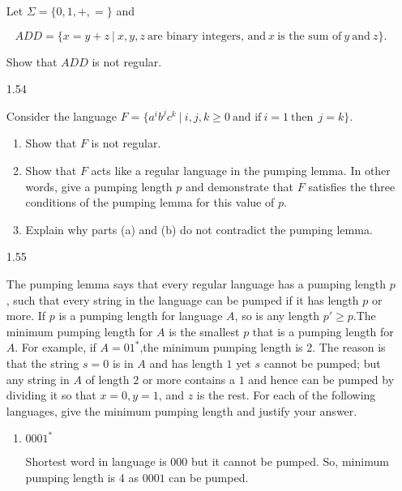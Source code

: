 \begin{enumerate}
            Let $\Sigma = \{0,1,+,=\}$ and 
            
            $$ADD = \{x=y+z~|~x,y,z~\text{are binary integers, and}~ x~ \text{is the sum of}~ y ~\text{and}~ z\}.$$
            
            Show that $ADD$ is not regular.
            
      \item [1.54]
            
            Consider the language $F = \{a^i b^j c^k ~|~ i,j,k \geq 0~ \text{and if}~ i=1~ \text{then}~~ j = k\}$. 
            \begin{enumerate}
                  \item Show that $F$ is not regular.
                  \item Show that $F$ acts like a regular language in the pumping lemma. In other words, give a pumping length $p$ and demonstrate that $F$ satisfies the three conditions of the pumping lemma for this value of $p$.
                  \item Explain why parts (a) and (b) do not contradict the pumping lemma.
                        
            \end{enumerate}
            
      \item [1.55]
            
            The pumping lemma says that every regular language has a pumping length $p$, such that every string in the language can be pumped if it has length $p$ or more. If $p$ is a pumping length for language $A$, so is any length $p' \ge p$.The minimum pumping length for $A$ is the smallest $p$ that is a pumping length for $A$. For example, if $A=01^\ast$,the minimum pumping length is 2. The reason is that the string $s = 0$ is in $A$ and has length $1$ yet $s$ cannot be pumped; but any string in $A$ of length $2$ or more contains a $1$ and hence can be pumped by dividing it so that $x = 0, y = 1$, and $z$ is the rest. For each of the following languages, give the minimum pumping length and justify your answer.
            
            \begin{enumerate}
                  \item $0001^\ast$
                        
                        Shortest word in language is $000$ but it cannot be pumped. So, minimum pumping length is 4 as $0001$ can be pumped.
                        

\end{enumerate}
\end{enumerate}
